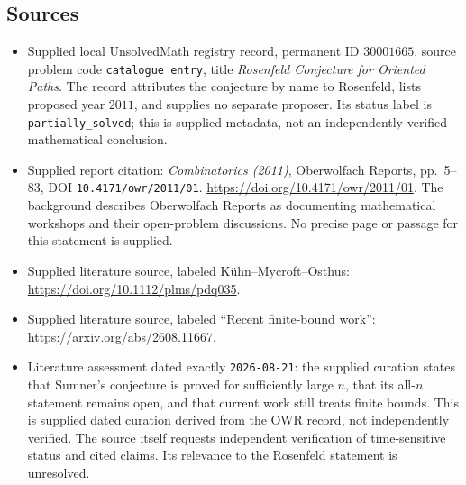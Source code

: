 \documentclass[11pt]{article}
\begin{document}
\subsection{Sources}
\begin{itemize}
\item Supplied local UnsolvedMath registry record, permanent ID \(30001665\), source problem code \texttt{catalogue entry}, title \emph{Rosenfeld Conjecture for Oriented Paths}. The record attributes the conjecture by name to Rosenfeld, lists proposed year \(2011\), and supplies no separate proposer. Its status label is \texttt{partially\_solved}; this is supplied metadata, not an independently verified mathematical conclusion.
\item Supplied report citation: \emph{Combinatorics (2011)}, Oberwolfach Reports, pp.\ 5--83, DOI \texttt{10.4171/owr/2011/01}. \url{https://doi.org/10.4171/owr/2011/01}. The background describes Oberwolfach Reports as documenting mathematical workshops and their open-problem discussions. No precise page or passage for this statement is supplied.
\item Supplied literature source, labeled K\"uhn--Mycroft--Osthus: \url{https://doi.org/10.1112/plms/pdq035}.
\item Supplied literature source, labeled ``Recent finite-bound work'': \url{https://arxiv.org/abs/2608.11667}.
\item Literature assessment dated exactly \texttt{2026-08-21}: the supplied curation states that Sumner's conjecture is proved for sufficiently large \(n\), that its all-\(n\) statement remains open, and that current work still treats finite bounds. This is supplied dated curation derived from the OWR record, not independently verified. The source itself requests independent verification of time-sensitive status and cited claims. Its relevance to the Rosenfeld statement is unresolved.
\end{itemize}
\end{document}
